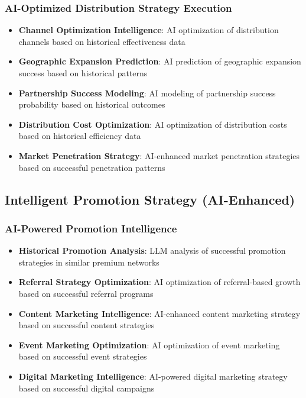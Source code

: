 \subsubsection{AI-Optimized Distribution Strategy Execution}

\begin{itemize}
    \item \textbf{Channel Optimization Intelligence}: AI optimization of distribution channels based on historical effectiveness data
    \item \textbf{Geographic Expansion Prediction}: AI prediction of geographic expansion success based on historical patterns
    \item \textbf{Partnership Success Modeling}: AI modeling of partnership success probability based on historical outcomes
    \item \textbf{Distribution Cost Optimization}: AI optimization of distribution costs based on historical efficiency data
    \item \textbf{Market Penetration Strategy}: AI-enhanced market penetration strategies based on successful penetration patterns
\end{itemize}

\subsection{Intelligent Promotion Strategy (AI-Enhanced)}

\subsubsection{AI-Powered Promotion Intelligence}

\begin{itemize}
    \item \textbf{Historical Promotion Analysis}: LLM analysis of successful promotion strategies in similar premium networks
    \item \textbf{Referral Strategy Optimization}: AI optimization of referral-based growth based on successful referral programs
    \item \textbf{Content Marketing Intelligence}: AI-enhanced content marketing strategy based on successful content strategies
    \item \textbf{Event Marketing Optimization}: AI optimization of event marketing based on successful event strategies
    \item \textbf{Digital Marketing Intelligence}: AI-powered digital marketing strategy based on successful digital campaigns
\end{itemize}

